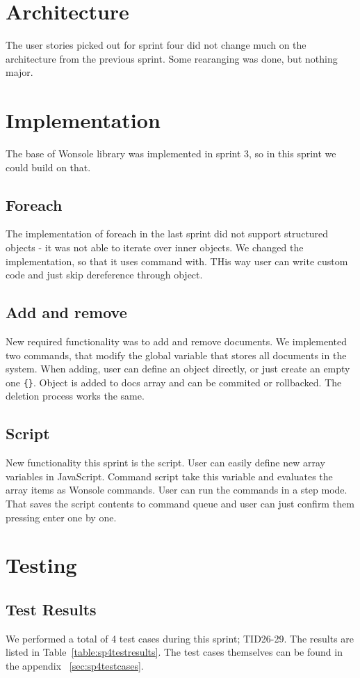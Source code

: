 \section{Architecture}
The user stories picked out for sprint four did not change much on the architecture from the previous sprint. Some rearanging was done, but nothing major.

\section{Implementation}
The base of Wonsole library was implemented in sprint 3, so in this sprint we
could build on that.

\subsection{Foreach}
The implementation of foreach in the last sprint did not support structured
objects - it was not able to iterate over inner objects. We changed the
implementation, so that it uses command with. THis way user can write custom
code and just skip dereference through object.

\subsection{Add and remove}
New required functionality was to add and remove documents. We implemented two
commands, that modify the global variable that stores all documents in the
system. When adding, user can define an object directly, or just create an empty
one \verb|{}|. Object is added to docs array and can be commited or rollbacked.
The deletion process works the same.

\subsection{Script}
New functionality this sprint is the script. User can easily define new array
variables in JavaScript. Command script take this variable and evaluates the
array items as Wonsole commands.  User can run the commands in a step mode. That
saves the script contents to command queue and user can just confirm them
pressing enter one by one.



\section{Testing}
\subsection{Test Results}
We performed a total of 4 test cases during this sprint; TID26-29. The results are listed in Table~\ref{table:sp4testresults}. The test cases themselves can be found in the appendix ~\ref{sec:sp4testcases}.

